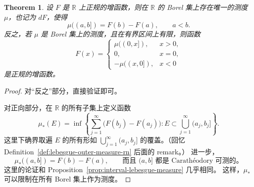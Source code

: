 \documentclass[12pt,letterpaper,twoside,openright]{ctexbook}
\theoremstyle{bluehead}
\newtheorem{theorem}{Theorem}
\theoremstyle{olivehead}
\theoremstyle{orangehead}
\theoremstyle{redremark}
\begin{document}
\begin{theorem}
设 $F$ 是 $\mathbb{R}$ 上正规的增函数，则在 $\mathbb{R}$ 的 Borel 集上存在唯一的测度 $\mu$，也记为 $dF$，使得
\[
\mu((a,b])=F(b)-F(a),\qquad a<b.
\]
反之，若 $\mu$ 是 Borel 集上的测度，且在有界区间上有限，则函数
\[
F(x)=
\begin{cases}
\mu((0,x]),&x>0,\\
0,&x=0,\\
-\mu((x,0]),&x<0
\end{cases}
\]
是正规的增函数。
\end{theorem}
\begin{proof}
对“反之”部分，直接验证即可。

对正向部分，在 $\mathbb{R}$ 的所有子集上定义函数
\[
\mu_*(E)=\inf\left\{\sum_{j=1}^{\infty}\bigl(F(b_j)-F(a_j)\bigr):
E\subset\bigcup_{j=1}^{\infty}(a_j,b_j]\right\}.
\]
这里下确界取遍 $E$ 的所有形如 $\bigcup_{j=1}^{\infty}(a_j,b_j]$ 的覆盖。（回忆 Definition~\ref{def:lebesgue-outer-measure-rn} 后面的 remark。）
进一步，
\[
\mu_*((a,b])=F(b)-F(a),\qquad\text{而且 }(a,b]\text{ 都是 Carathéodory 可测的。}
\]
这里的论证和 Proposition~\ref{prop:interval-lebesgue-measure} 几乎相同。
这样，$\mu_*$ 可以限制在所有 Borel 集上作为测度。
\end{proof}
\end{document}

